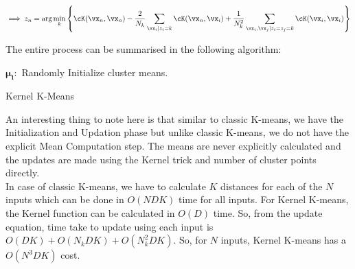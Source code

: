 \documentclass[a4paper,11pt]{article}
\begin{document}
\begin{mlsolution}
\begin{equation*}
    \implies z_n = \text{arg}\min\limits_k \bc{\cK(\vx_n,\vx_n) - \frac{2}{N_k}\sum\limits_{\vx_i | z_i=k} \cK(\vx_n, \vx_i) + \frac{1}{N_k^2}\sum\limits_{\vx_i, \vx_j | z_i=z_j=k}\cK(\vx_i, \vx_i)}
\end{equation*}

\pagebreak
The entire process can be summarised in the following algorithm:
\begin{algorithm}
    \DontPrintSemicolon
    \SetAlgoLined
    $\pmb{\mu_i} :$ Randomly Initialize cluster means.
    \caption{Kernel K-Means}
\end{algorithm}

An interesting thing to note here is that similar to classic K-means, we have the Initialization and Updation phase but unlike classic K-means, we do not have the explicit Mean Computation step. The means are never explicitly calculated and the updates are made using the Kernel trick and number of cluster points directly. \\

In case of classic K-means, we have to calculate $K$ distances for each of the $N$ inputs which can be done in $O(NDK)$ time for all inputs.
For Kernel K-means, the Kernel function can be calculated in $O(D)$ time. So, from the update equation, time take to update using each input is $O(DK) + O(N_kDK) + O(N_k^2DK)$. So, for $N$ inputs, Kernel K-means has a $O(N^3DK)$ cost.

\end{mlsolution}
\end{document}

